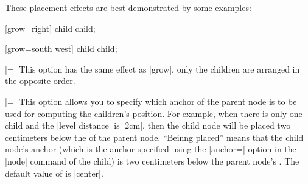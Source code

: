 \begin{itemize}
  These placement effects are best demonstrated by some examples:
\begin{codeexample}[]
\tikz {} [grow=right] child child;
\end{codeexample}

\begin{codeexample}[]
\tikz {} [grow=south west] child child;
\end{codeexample}

\begin{codeexample}[]
\end{codeexample}

\begin{codeexample}[]
\end{codeexample}

\begin{codeexample}[]
\end{codeexample}

  |=|
  This option has the same effect as |grow|, only the children are
  arranged in the opposite order.

  |=|
  This option allows you to specify which anchor of the parent node is
  to be used for computing the children's position. For example, when
  there is only one child and the |level distance| is |2cm|, then the
  child node will be placed two centimeters below the  of
  the parent node. ``Beinng placed'' means that the child node's
  anchor (which is the anchor specified using the |anchor=| option in
  the |node| command of the child) is two centimeters below the parent
  node's . The default value of  is
  |center|.


\end{itemize}
